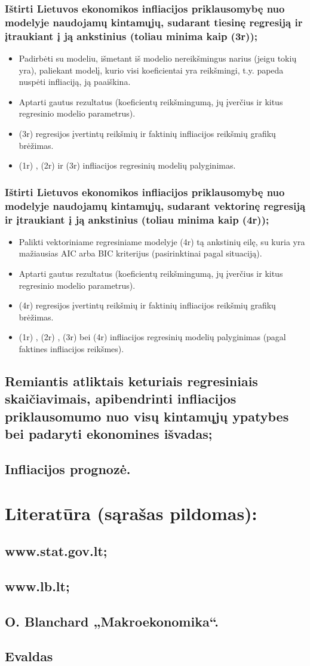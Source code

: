 \documentclass[a4paper]{article}
\begin{document}
\subsubsection{Ištirti Lietuvos ekonomikos infliacijos priklausomybę nuo modelyje naudojamų kintamųjų, sudarant tiesinę regresiją ir  įtraukiant į ją ankstinius (toliau minima kaip (3r));}
\begin{itemize}
\item Padirbėti su modeliu, išmetant iš modelio nereikšmingus narius (jeigu tokių yra), paliekant modelį, kurio visi koeficientai yra reikšmingi, t.y. papeda nuspėti infliaciją, ją paaiškina.
\item Aptarti gautus rezultatus (koeficientų reikšmingumą, jų įverčius ir kitus regresinio modelio parametrus).
\item (3r) regresijos įvertintų reikšmių ir faktinių infliacijos reikšmių grafikų brėžimas.
\item (1r) , (2r) ir (3r) infliacijos regresinių modelių palyginimas.
\end{itemize}
\subsubsection{Ištirti Lietuvos ekonomikos infliacijos priklausomybę nuo modelyje naudojamų kintamųjų, sudarant vektorinę regresiją ir įtraukiant į ją ankstinius (toliau minima kaip (4r));}
\begin{itemize}
\item Palikti vektoriniame regresiniame  modelyje (4r)  tą ankstinių eilę, su kuria yra mažiausias AIC arba BIC kriterijus (pasirinktinai pagal situaciją).
\item Aptarti gautus rezultatus (koeficientų reikšmingumą, jų įverčius ir kitus regresinio modelio parametrus).
\item (4r) regresijos įvertintų reikšmių ir faktinių infliacijos reikšmių grafikų brėžimas.
\item (1r) , (2r) , (3r) bei (4r) infliacijos regresinių modelių palyginimas (pagal faktines infliacijos reikšmes).
\end{itemize}
\subsection{Remiantis atliktais keturiais regresiniais skaičiavimais, apibendrinti infliacijos priklausomumo  nuo visų kintamųjų ypatybes bei padaryti ekonomines išvadas;}
\subsection{	Infliacijos prognozė.}
\section{Literatūra (sąrašas pildomas):}
\subsection {www.stat.gov.lt;} 
\subsection{www.lb.lt;}
\subsection{O. Blanchard  „Makroekonomika“.}
\subsection{Evaldas}
\end{document}
